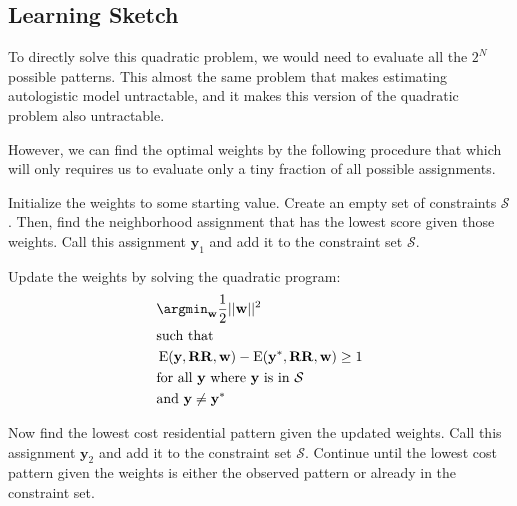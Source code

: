 \subsection*{Learning Sketch}
To directly solve this quadratic problem, we would need to evaluate
all the $2^N$ possible patterns. This almost the same problem that
makes estimating autologistic model untractable, and it makes this
version of the quadratic problem also untractable.

However, we can find the optimal weights by the following procedure
that which will only requires us to evaluate only a tiny fraction of
all possible assignments.

Initialize the weights to some starting value. Create an empty set of
constraints $\mathcal{S}$. Then, find the neighborhood assignment that
has the lowest score given those weights. Call this assignment
$\mathbf{y}_1$ and add it to the constraint set $\mathcal{S}$.

Update the weights by solving the quadratic program: 
%
\begin{align*}
&\argmin_{\mathbf{w}} \frac{1}{2}||\mathbf{w}||^2 \\
&\text{such that} \\
&\operatorname{E}(\mathbf{y}, \mathbf{RR}, \mathbf{w})
- \operatorname{E}(\mathbf{y}^*, \mathbf{RR}, \mathbf{w}) \geq 1 \\ 
&\text{for all } \mathbf{y} \text{ where } \mathbf{y} \text{ is in } \mathcal{S}\\
&\text{and } \mathbf{y} \neq \mathbf{y}^*
\end{align*}
%

Now find the lowest cost residential pattern given the updated
weights. Call this assignment $\mathbf{y}_2$ and add it to the
constraint set $\mathcal{S}$. Continue until the lowest cost
pattern given the weights is either the observed pattern or
already in the constraint set.\cite{szummer_learning_2008}

